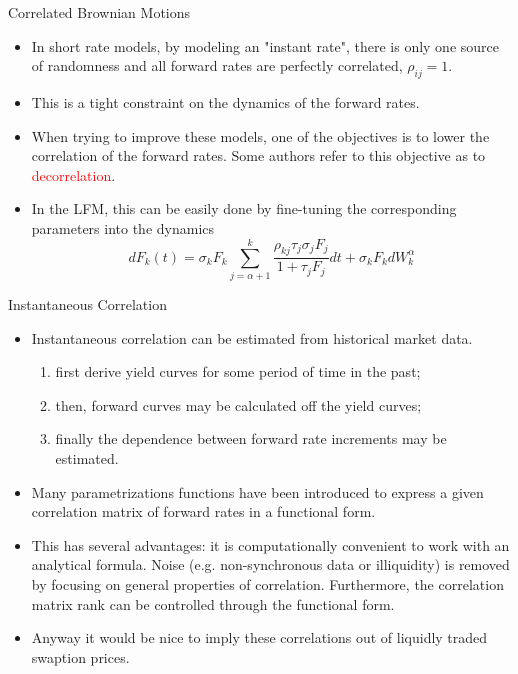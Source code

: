 \documentclass{beamer}
\begin{document}
\begin{frame}{Correlated Brownian Motions}
	\begin{itemize}
	\item<1-> In short rate models, by modeling an "instant rate", there is only one source of randomness and all forward rates are perfectly correlated, $\rho_{ij}=1$.
	\item<1-> This is a tight constraint on the dynamics of the forward rates.
	\item<2-> When trying to improve these models, one of the objectives is to lower the correlation of the forward rates. Some authors refer to this objective as to \textcolor{red}{decorrelation}. 
	\item<3-> In the LFM, this can be easily done by fine-tuning the corresponding parameters into the dynamics 
	\begin{equation*}
dF_k(t) = \sigma_kF_k\sum_{j=\alpha+1}^k\frac{\boxed{\rho_{kj}}\tau_j\sigma_jF_j}{1+\tau_jF_j}dt+\sigma_kF_k dW^\alpha_k
	\end{equation*}
\end{itemize}
\end{frame}

\begin{frame}{Instantaneous Correlation}
  \begin{itemize}    
  \item<1-> Instantaneous correlation can be estimated from historical market data.
  \begin{enumerate}
	  \item first derive yield curves for some period of time in the past;
	  \item then, forward curves may be calculated off the yield curves;
	  \item finally the dependence between forward rate increments may be estimated. 
  \end{enumerate}
  \item<2-> Many parametrizations functions have been introduced to express a given correlation matrix of forward rates in a functional form.
  \item<3-> This has several advantages: it is computationally convenient to work with an analytical formula. Noise (e.g. non-synchronous data or illiquidity) is removed by focusing on general properties of correlation. Furthermore, the correlation matrix rank can be controlled through the functional form.
  \item<4-> Anyway it would be nice to imply these correlations out of liquidly traded swaption prices. 
  \end{itemize}
\end{frame}
\end{document}
